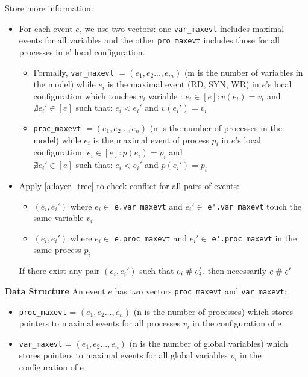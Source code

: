 \documentclass{llncs}
\begin{document}
\begin{enumerate}
\begin{itemize}
			 Store more information:	
			\begin{itemize}
				\item 
					For each event $e$, we use two vectors: one \verb!var_maxevt! includes maximal events  
					for all variables and 
					the other \verb!pro_maxevt! includes those for all processes in e' local configuration.
					\begin{itemize}
					\item
						Formally, \verb!var_maxevt! $ = (e_1, e_2...,e_m)$  (m is the number of variables in 
						the model)
						while $e_i$ is the maximal event (RD, SYN, WR) in $e$'s local configuration which 
						touches $v_i$ variable :
						$e_i \in  \left[ e \right]: v(e_i) = v_i$ and $ \nexists e_i' \in \left[ e \right] $ 
						such that:
						$e_i < e_i'$ and $v(e_i') = v_i$ 
					\item
						\verb!proc_maxevt! $ = (e_1, e_2...,e_n)$  (n is the number of processes in the
						 model)
						while $e_i$ is the maximal event of process $p_i$ in $e$'s local configuration:
						$e_i \in  \left[ e \right]: p(e_i) = p_i$ and \\
						$ \nexists e_i' \in \left[ e \right] $ such that:
						$e_i < e_i'$ and $p(e_i') = p_i$ 
					\end{itemize}				
				\item
					Apply \cref{a:layer_tree} to check conflict for all pairs of events:
					\begin{itemize}
						\item
							$(e_i, e_i')$ where $e_i \in $ \verb!e.var_maxevt! 	
							and $e_i'\in $ \verb!e'.var_maxevt! touch the same variable $v_i$
						\item
							$(e_i, e_i')$ where $e_i \in $ \verb!e.proc_maxevt! 	
							and $e_i'\in $ \verb!e'.proc_maxevt! in the same process $p_i$
					\end{itemize}
					
					If there exist any pair $(e_i, e_i')$ such that $e_i \mathrel{\#} e_i'$, then necessarily $e \mathrel{\#} e'$			
			\end{itemize}	
		\end{itemize}
\end{enumerate}

\noindent
\textbf{Data Structure}
An event $e$ has two vectors \verb!proc_maxevt! and \verb!var_maxevt!:
\begin{itemize}
	\item
		\verb!proc_maxevt! = $(e_1, e_2...,e_n)$ (n is the number of processes)
		which stores pointers to maximal events for all processes $v_i$ in the configuration of e
	\item
		\verb!var_maxevt! = $(e_1, e_2...,e_n)$ (n is the number of global variables)
		which stores pointers to maximal events for all global variables $v_i$ in the configuration of e	
\end{itemize}
\end{document}

